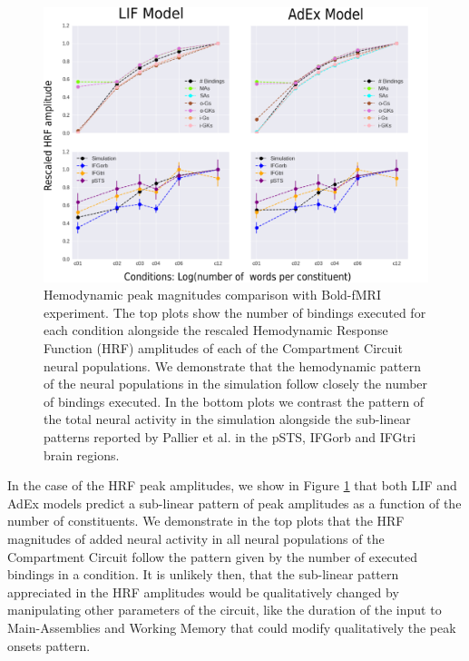 \documentclass[10pt]{article}
\begin{document}
\begin{figure}[h!]
  \begin{center}
    \includegraphics[width=1.00\columnwidth]{figures/pnas_comparison-02}
    \caption{{Hemodynamic peak magnitudes comparison with Bold-fMRI experiment.
    The top plots show the number of bindings executed for each condition alongside the rescaled Hemodynamic Response Function (HRF) amplitudes of each of the Compartment Circuit neural populations.
    We demonstrate that the hemodynamic pattern of the neural populations in the simulation follow closely the number of bindings executed.
    In the bottom plots we contrast the pattern of the total neural activity in the simulation alongside the sub-linear patterns reported by Pallier et al. in the pSTS, IFGorb and IFGtri brain regions.
        {\label{fig:pnas-2}}%
      }}
  \end{center}
\end{figure}


In the case of the HRF peak amplitudes, we show in Figure \ref{fig:pnas-2} that both LIF and AdEx models predict a sub-linear pattern of peak amplitudes as a function of the number of constituents.
We demonstrate in the top plots that the HRF magnitudes of added neural activity in all neural populations of the Compartment Circuit follow the pattern given by the number of executed bindings in a condition.
It is unlikely then, that the sub-linear pattern appreciated in the HRF amplitudes would be qualitatively changed by manipulating other parameters of the circuit, like the duration of the input to Main-Assemblies and Working Memory that could modify qualitatively the peak onsets pattern.
\end{document}
